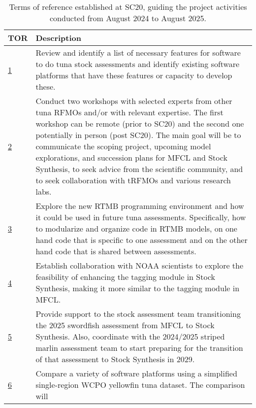 \documentclass{SCreport}
\begin{document}
\begin{table}
  \renewcommand\arraystretch{1.25}
  \centering
  \captionsetup{width=0.90\textwidth}
  \caption{Terms of reference established at SC20, guiding the project
    activities conducted from August 2024 to August 2025.\label{tab:tors}}
  \vspace{1ex}
  \begin{tabular}{p{1cm}p{13cm}}
    \hline
    TOR & Description\\
    \hline
    \hyperlink{link:tor-1}{1}
        & Review and identify a list of necessary features for software to do
          tuna stock assessments and identify existing software platforms that
          have these features or capacity to develop these.\\
    \hline
    \hyperlink{link:tor-2}{2}
        & Conduct two workshops with selected experts from other tuna RFMOs
          and/or with relevant expertise. The first workshop can be remote
          (prior to SC20) and the second one potentially in person (post SC20).
          The main goal will be to communicate the scoping project, upcoming
          model explorations, and succession plans for MFCL and Stock Synthesis,
          to seek advice from the scientific community, and to seek
          collaboration with tRFMOs and various research labs.\\
    \hline
    \hyperlink{link:tor-3}{3}
        & Explore the new RTMB programming environment and how it could be used
          in future tuna assessments. Specifically, how to modularize and
          organize code in RTMB models, on one hand code that is specific to one
          assessment and on the other hand code that is shared between
          assessments.\\
    \hline
    \hyperlink{link:tor-4}{4}
        & Establish collaboration with NOAA scientists to explore the
          feasibility of enhancing the tagging module in Stock Synthesis, making
          it more similar to the tagging module in MFCL.\\
    \hline
    \hyperlink{link:tor-5}{5}
        & Provide support to the stock assessment team transitioning the 2025
          swordfish assessment from MFCL to Stock Synthesis. Also, coordinate
          with the 2024/2025 striped marlin assessment team to start preparing
          for the transition of that assessment to Stock Synthesis in 2029.\\
    \hline
    \hyperlink{link:tor-6}{6}
        & Compare a variety of software platforms using a simplified
          single-region WCPO yellowfin tuna dataset. The comparison will

\end{tabular}
\end{table}
\end{document}
